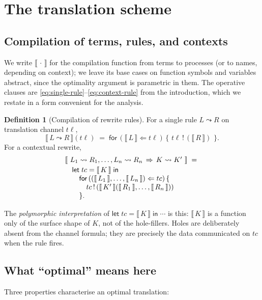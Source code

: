 \documentclass[11pt]{article}
\theoremstyle{plain}
\theoremstyle{definition}
\newtheorem{definition}[theorem]{Definition}
\theoremstyle{remark}
\newcommand{\sem}[1]{\llbracket\,#1\,\rrbracket}
\newcommand{\rew}{\leadsto}
\newcommand{\Send}[2]{#1 \,!\, (#2)}
\newcommand{\Recv}[3]{\mathsf{for}\,(#1 \Leftarrow #2)\,\{\,#3\,\}}
\newcommand{\Let}[3]{\mathsf{let}\;#1 = #2\;\mathsf{in}\;#3}
\begin{document}
\section{The translation scheme}\label{sec:translation}

\subsection{Compilation of terms, rules, and contexts}

We write $\sem{\cdot}$ for the compilation function from terms to processes
(or to names, depending on context); we leave its base cases on function
symbols and variables abstract, since the optimality argument is
parametric in them. The operative clauses are
\eqref{eq:single-rule}--\eqref{eq:context-rule} from the introduction,
which we restate in a form convenient for the analysis.

\begin{definition}[Compilation of rewrite rules]\label{def:compile}
For a single rule $L \rew R$ on translation channel $t\!\ell$,
\[
  \sem{L \rew R}(t\!\ell)
  \;=\;
  \Recv{\sem{L}}{t\!\ell}{\,\Send{t\!\ell}{\sem{R}}\,}.
\]
For a contextual rewrite,
\[
\begin{array}{@{}l@{}}
  \sem{\,L_{1} \rew R_{1}, \ldots, L_{n} \rew R_{n}
        \,\Rightarrow\, K \rew K'\,} \;=\; \\[2pt]
  \quad \mathsf{let}\;tc = \sem{K}\;\mathsf{in} \\
  \quad\quad \mathsf{for}\,((\sem{L_{1}}, \ldots, \sem{L_{n}}) \Leftarrow tc)\,\{ \\
  \quad\quad\quad \Send{tc}{\sem{K'}(\sem{R_{1}}, \ldots, \sem{R_{n}})} \\
  \quad\quad \}.
\end{array}
\]
\end{definition}

The \emph{polymorphic interpretation} of $\Let{tc}{\sem{K}}{\cdots}$ is
this: $\sem{K}$ is a function only of the surface shape of $K$, not of the
hole-fillers. Holes are deliberately absent from the channel formula; they
are precisely the data communicated on $tc$ when the rule fires.

\subsection{What ``optimal'' means here}\label{ssec:optimal-meaning}

Three properties characterise an optimal translation:
\end{document}
